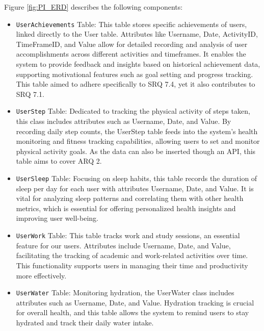 \documentclass[12pt]{article}
\begin{document}
Figure \ref{fig:PI_ERD} describes the following components:

\begin{itemize}

    \item \texttt{UserAchievements} Table: This table stores specific
        achievements of users, linked directly to the User table. Attributes
        like Username, Date, ActivityID, TimeFrameID, and Value allow for
        detailed recording and analysis of user accomplishments across
        different activities and timeframes. It enables the system to provide
        feedback and insights based on historical achievement data, supporting
        motivational features such as goal setting and progress tracking. This 
        table aimed to adhere specifically to SRQ 7.4, yet it also contributes to SRQ 7.1.\par

    \item \texttt{UserStep} Table: Dedicated to tracking the physical activity
        of steps taken, this class includes attributes such as Username, Date,
        and Value. By recording daily step counts, the UserStep table feeds
        into the system’s health monitoring and fitness tracking capabilities,
        allowing users to set and monitor physical activity goals. As the data 
        can also be inserted though an API, this table aims to cover ARQ 2.\par

    \item \texttt{UserSleep} Table: Focusing on sleep habits, this table
        records the duration of sleep per day for each user with attributes
        Username, Date, and Value. It is vital for analyzing sleep patterns
        and correlating them with other health metrics, which is essential for
        offering personalized health insights and improving user
        well-being.\par

    \item \texttt{UserWork} Table: This table tracks work and study sessions,
        an essential feature for our users. Attributes include
        Username, Date, and Value, facilitating the tracking of
        academic and work-related activities over time. This functionality
        supports users in managing their time and productivity more
        effectively.\par

    \item \texttt{UserWater} Table: Monitoring hydration, the UserWater class
        includes attributes such as Username, Date, and Value. Hydration
        tracking is crucial for overall health, and this table allows the
        system to remind users to stay hydrated and track their daily water
        intake.\par


\end{itemize}
\end{document}
